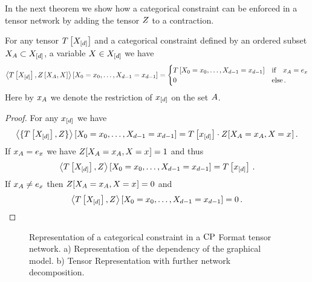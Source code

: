 In the next theorem we show how a categorical constraint can be enforced in a tensor network by adding the tensor $Z$ to a contraction.

\begin{theorem}
    For any tensor $T\left[X_{[d]}\right]$ and a categorical constraint defined by an ordered subset $X_{A}\subset X_{[d]}$, a variable $X\in X_{[d]}$ we have
    \begin{align*}
        \left\langle T\left[X_{[d]}\right],Z\left[X_{A},X\right]\right\rangle \left[ X_{0}=x_{0},\ldots,X_{d-1}=x_{d-1} \right]
        = \begin{cases}
              T\left[X_{0}=x_{0},\ldots,X_{d-1}=x_{d-1}\right] & \text{if} \quad x_{A} = e_{x} \\
              0 & \text{else} \, .
        \end{cases}
    \end{align*}
    Here by $x_{A}$ we denote the restriction of $x_{[d]}$ on the set $A$.
\end{theorem}
\begin{proof}
    For any $x_{[d]}$ we have
    \[ \left\langle \{T\left[X_{[d]}\right], Z\}\right\rangle \left[ X_{0}=x_{0},\ldots,X_{d-1}=x_{d-1} \right]  =
    T\left[x_{[d]}\right] \cdot Z[X_{A}=x_{A},X_{}=x_{}] \, .
    \]
    If $x_{A} = e_{x}$ we have $Z[X_{A}=x_{A},X_{}=x_{}] = 1$ and thus
    \[ \left\langle T\left[X_{[d]}\right],Z\right\rangle \left[ X_{0}=x_{0},\ldots,X_{d-1}=x_{d-1} \right]  =  T\left[x_{[d]}\right]  \, . \]
    If $x_{A} \neq e_{x}$ then $Z[X_{A}=x_{A},X_{}=x_{}] = 0$ and
    \[ \left\langle T\left[X_{[d]}\right],Z\right\rangle \left[ X_{0}=x_{0},\ldots,X_{d-1}=x_{d-1} \right]  = 0 \, . \]
\end{proof}

\begin{figure}[h]
    \begin{center}
        
    \end{center}
    \caption{Representation of a categorical constraint in a $\mathrm{CP}$ Format tensor network.
    a) Representation of the dependency of the graphical model.
    b) Tensor Representation with further network decomposition.
    }
    \label{fig:CategoricalDecomposition}
\end{figure}


